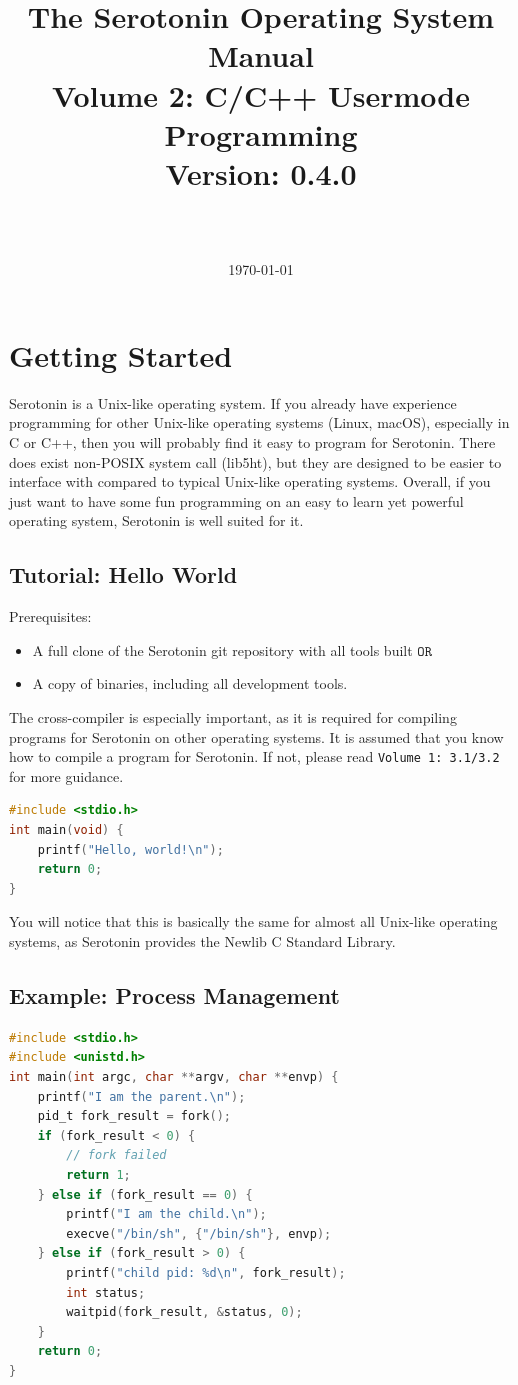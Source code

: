 \documentclass[11pt,a4paper]{article}
\title{
	\textbf{\Huge The Serotonin Operating System Manual} \\
	\large{Volume 2: C/C++ Usermode Programming} \\
	\vspace{0.5cm}
	\vspace{0.3cm}
	Version: 0.4.0 \\
	\vspace{0.5cm}
	\textit{} \\
	\date{\today}
}
\author{}
\begin{document}
	\maketitle
	\tableofcontents
	\newpage

	\section{Getting Started}
	Serotonin is a Unix-like operating system. If you already have experience programming for other Unix-like operating systems (Linux, macOS), especially in C or C++, then you will probably find it easy to program for Serotonin. There does exist non-POSIX system call (lib5ht), but they are designed to be easier to interface with compared to typical Unix-like operating systems.
	Overall, if you just want to have some fun programming on an easy to learn yet powerful operating system, Serotonin is well suited for it.

	\subsection{Tutorial: Hello World}
	Prerequisites:
	\begin{itemize}
		\item A full clone of the Serotonin git repository with all tools built $\texttt{OR}$
		\item A copy of binaries, including all development tools.
	\end{itemize}
	The cross-compiler is especially important, as it is required for compiling programs for Serotonin on other operating systems. It is assumed that you know how to compile a program for Serotonin. If not, please read \texttt{Volume 1: 3.1/3.2} for more guidance.
	\begin{lstlisting}[language=C]
#include <stdio.h>
int main(void) {
    printf("Hello, world!\n");
    return 0;
}
	\end{lstlisting}
	You will notice that this is basically the same for almost all Unix-like operating systems, as Serotonin provides the Newlib C Standard Library.

	\subsection{Example: Process Management}
	\begin{lstlisting}[language=C]
#include <stdio.h>
#include <unistd.h>
int main(int argc, char **argv, char **envp) {
    printf("I am the parent.\n");
    pid_t fork_result = fork();
    if (fork_result < 0) {
        // fork failed
        return 1;
    } else if (fork_result == 0) {
    	printf("I am the child.\n");
    	execve("/bin/sh", {"/bin/sh"}, envp);
    } else if (fork_result > 0) {
        printf("child pid: %d\n", fork_result);
        int status;
        waitpid(fork_result, &status, 0);
    }
    return 0;
}
	\end{lstlisting}
\end{document}
